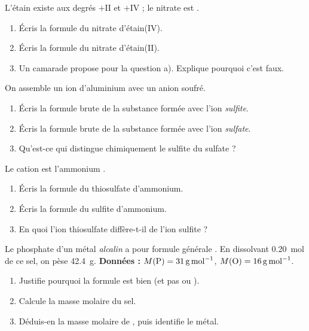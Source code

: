 \documentclass[11pt,a4paper]{article}
\begin{document}
\begin{exo}
L'étain existe aux degrés $+\mathrm{II}$ et $+\mathrm{IV}$ ; le nitrate est .
\begin{enumerate}[label=\alph*)]
  \item Écris la formule du nitrate d'étain(IV).
  \item Écris la formule du nitrate d'étain(II).
  \item Un camarade propose  pour la question a). Explique pourquoi c'est faux.
\end{enumerate}
\end{exo}

\begin{exo}
On assemble un ion d'aluminium  avec un anion soufré.
\begin{enumerate}[label=\alph*)]
  \item Écris la formule brute de la substance formée avec l'ion \emph{sulfite}.
  \item Écris la formule brute de la substance formée avec l'ion \emph{sulfate}.
  \item Qu'est-ce qui distingue chimiquement le sulfite du sulfate ?
\end{enumerate}
\end{exo}

\begin{exo}
Le cation est l'ammonium .
\begin{enumerate}[label=\alph*)]
  \item Écris la formule du thiosulfate d'ammonium.
  \item Écris la formule du sulfite d'ammonium.
  \item En quoi l'ion thiosulfate  diffère-t-il de l'ion sulfite  ?
\end{enumerate}
\end{exo}

\begin{exo}
Le phosphate d'un métal \emph{alcalin}  a pour formule générale . En dissolvant
\qty{0,20}{\mol} de ce sel, on pèse \qty{42,4}{\gram}. \textbf{Données :}
$M(\ce{P})=\qty{31}{\gram\per\mol}$, $M(\ce{O})=\qty{16}{\gram\per\mol}$.
\begin{enumerate}[label=\alph*)]
  \item Justifie pourquoi la formule est bien  (et pas  ou ).
  \item Calcule la masse molaire du sel.
  \item Déduis-en la masse molaire de , puis identifie le métal.
\end{enumerate}
\end{exo}
\end{document}
